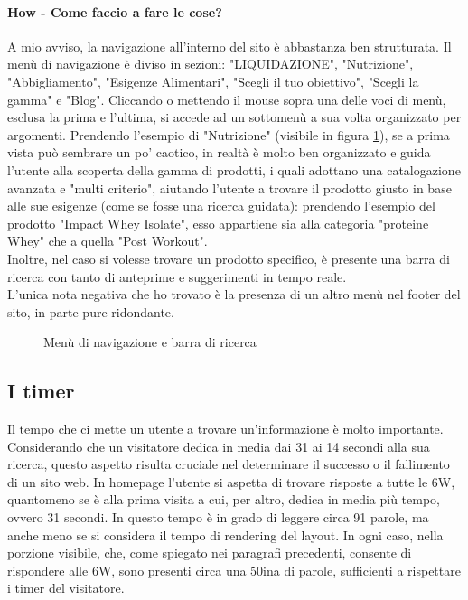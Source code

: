 \paragraph{How - Come faccio a fare le cose?}
\label{paragraph:how}
A mio avviso, la navigazione all'interno del sito è abbastanza ben strutturata. Il menù di navigazione è diviso in sezioni: "LIQUIDAZIONE", "Nutrizione", "Abbigliamento", "Esigenze Alimentari", "Scegli il tuo obiettivo", "Scegli la gamma" e "Blog".
Cliccando o mettendo il mouse sopra una delle voci di menù, esclusa la prima e l'ultima, si accede ad un sottomenù a sua volta organizzato per argomenti. Prendendo l'esempio di "Nutrizione"  (visibile in figura \ref{fig:figura4}), se a prima vista può sembrare un po' caotico, in realtà è molto ben organizzato e guida l'utente alla scoperta della gamma di prodotti, i quali adottano una catalogazione avanzata e "multi criterio", aiutando l'utente a trovare il prodotto giusto in base alle sue esigenze (come se fosse una ricerca guidata): prendendo l'esempio del prodotto "Impact Whey Isolate", esso appartiene sia alla categoria "proteine Whey" che a quella "Post Workout". \\Inoltre, nel caso si volesse trovare un prodotto specifico, è presente una barra di ricerca con tanto di anteprime e suggerimenti in tempo reale.\\L'unica nota negativa che ho trovato è la presenza di un altro menù nel footer del sito, in parte pure ridondante.
\begin{figure}[!htb]
	\caption{\label{fig:figura4} Menù di navigazione e barra di ricerca}
\end{figure}
\subsection{I timer}
Il tempo che ci mette un utente a trovare un'informazione è molto importante. Considerando che un visitatore dedica in media dai 31 ai 14 secondi alla sua ricerca, questo aspetto risulta cruciale nel determinare il successo o il fallimento di un sito web. In homepage l'utente si aspetta di trovare risposte a tutte le 6W, quantomeno se è alla prima visita a cui, per altro, dedica in media più tempo, ovvero 31 secondi. In questo tempo è in grado di leggere circa 91 parole, ma anche meno se si considera il tempo di rendering del layout. In ogni caso, nella porzione visibile, che, come spiegato nei paragrafi precedenti, consente di rispondere alle 6W, sono presenti circa una 50ina di parole, sufficienti a rispettare i timer del visitatore.